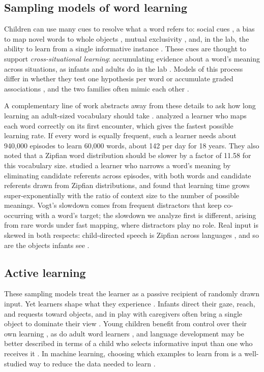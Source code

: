 \documentclass[a4paper,natbib,man]{apa6}
\begin{document}
\subsection{Sampling models of word learning}
Children can use many cues to resolve what a word refers to: social cues \citep{HirshPasek:2000}, a bias to map novel words to whole objects \citep{Macnamara:1972}, mutual exclusivity \citep{Merriman:1989}, and, in the lab, the ability to learn from a single informative instance \citep[\textit{fast mapping};][]{Carey:1978,Spiegel:2011}. These cues are thought to support \textit{cross-situational learning}: accumulating evidence about a word's meaning across situations, as infants and adults do in the lab \citep{Smith:2008vg,Yu:2007}. Models of this process differ in whether they test one hypothesis per word \citep[e.g.,][]{Trueswell:2013} or accumulate graded associations \citep[e.g.,][]{McMurray:2012,Kachergis:2012gi}, and the two families often mimic each other \citep{Yu:2012hyp}.

A complementary line of work abstracts away from these details to ask how long learning an adult-sized vocabulary should take \citep{Blythe:2010,Vogt:2012,Blythe:2016}. \cite{Blythe:2010} analyzed a learner who maps each word correctly on its first encounter, which gives the fastest possible learning rate. If every word is equally frequent, such a learner needs about 940,000 episodes to learn 60,000 words, about 142 per day for 18 years. They also noted that a Zipfian word distribution should be slower by a factor of 11.58 for this vocabulary size. \cite{Vogt:2012} studied a learner who narrows a word's meaning by eliminating candidate referents across episodes, with both words and candidate referents drawn from Zipfian distributions, and found that learning time grows super-exponentially with the ratio of context size to the number of possible meanings. Vogt's slowdown comes from frequent distractors that keep co-occurring with a word's target; the slowdown we analyze first is different, arising from rare words under fast mapping, where distractors play no role. Real input is skewed in both respects: child-directed speech is Zipfian across languages \citep{LaviRotbain:2023}, and so are the objects infants see \citep{Clerkin:2017}.

\subsection{Active learning}
These sampling models treat the learner as a passive recipient of randomly drawn input. Yet learners shape what they experience \citep{gottlieb2018towards,Gureckis:2012}. Infants direct their gaze, reach, and requests toward objects, and in play with caregivers often bring a single object to dominate their view \citep{Yu:2009active}. Young children benefit from control over their own learning \citep{Partridge:2015}, as do adult word learners \citep{Kachergis:2013,zettersten2021sampling}, and language development may be better described in terms of a child who selects informative input than one who receives it \citep{Foushee:2023}. In machine learning, choosing which examples to learn from is a well-studied way to reduce the data needed to learn \citep{Settles:2012}.
\end{document}
